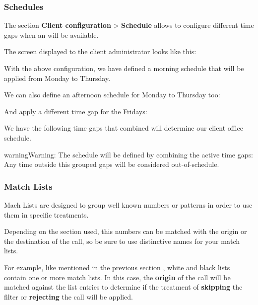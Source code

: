 \documentclass[letterpaper,10pt,english]{sphinxmanual}
\begin{document}
\subsubsection{Schedules}
\label{administration_portal/client/vpbx/routing_tools/schedules:id1}\label{administration_portal/client/vpbx/routing_tools/schedules::doc}\label{administration_portal/client/vpbx/routing_tools/schedules:schedules}
The section \textbf{Client configuration} \textgreater{} \textbf{Schedule} allows to configure
different time gaps when an {\hyperref[administration_portal/brand/views/ddis:ddis]{}} will be available.

The screen displayed to the client administrator looks like this:

With the above configuration, we have defined a morning schedule that will be
applied from Monday to Thursday.

We can also define an afternoon schedule for Monday to Thursday too:

And apply a different time gap for the Fridays:

We have the following time gaps that combined will determine our client
office schedule.

\begin{notice}{warning}{Warning:}
The schedule will be defined by combining the active time gaps:
Any time outside this grouped gaps will be considered out-of-schedule.
\end{notice}
\label{administration_portal/client/vpbx/routing_tools/match_lists:match-lists}

\subsubsection{Match Lists}
\label{administration_portal/client/vpbx/routing_tools/match_lists:match-lists}\label{administration_portal/client/vpbx/routing_tools/match_lists:id2}\label{administration_portal/client/vpbx/routing_tools/match_lists::doc}\label{administration_portal/client/vpbx/routing_tools/match_lists:id1}
Mach Lists are designed to group well known numbers or patterns in order to use
them in specific treatments.

Depending on the section used, this numbers can be matched with the origin or
the destination of the call, so be sure to use distinctive names for your match
lists.

For example, like mentioned in the previous section {\hyperref[administration_portal/client/vpbx/routing_tools/external_call_filters:external\string-filters]{}},
white and black lists contain one or more match lists. In this case, the
\textbf{origin} of the call will be matched against the list entries to determine if
the treatment of \textbf{skipping} the filter or \textbf{rejecting} the call will be applied.
\end{document}
